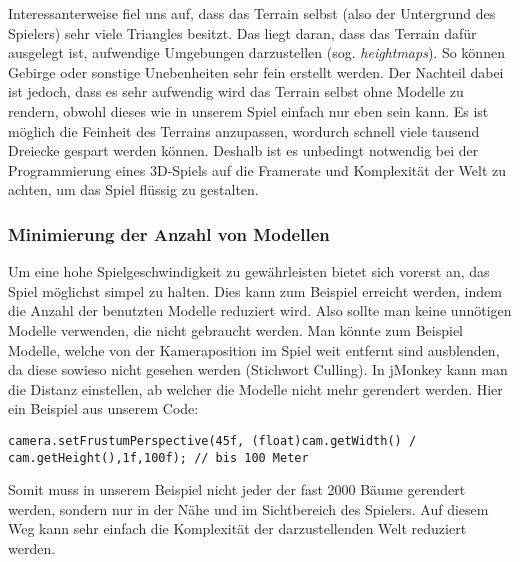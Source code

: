 Interessanterweise fiel uns auf, dass das Terrain selbst (also der Untergrund des Spielers) sehr viele Triangles besitzt. Das liegt daran, dass das Terrain dafür ausgelegt ist, aufwendige Umgebungen darzustellen (sog. \emph{heightmaps}). So können Gebirge oder sonstige Unebenheiten sehr fein erstellt werden. Der Nachteil dabei ist jedoch, dass es sehr aufwendig wird das Terrain selbst ohne Modelle zu rendern, obwohl dieses wie in unserem Spiel einfach nur eben sein kann. Es ist möglich die Feinheit des Terrains anzupassen, wordurch schnell viele tausend Dreiecke gespart werden können. Deshalb ist es unbedingt notwendig bei der Programmierung eines 3D-Spiels auf die Framerate und Komplexität der Welt zu achten, um das Spiel flüssig zu gestalten.



\subsubsection{Minimierung der Anzahl von Modellen}
Um eine hohe Spielgeschwindigkeit zu gewährleisten bietet sich vorerst an, das Spiel möglichst simpel zu halten. Dies kann zum Beispiel erreicht werden, indem die Anzahl der benutzten Modelle reduziert wird. Also sollte man keine unnötigen Modelle verwenden, die nicht gebraucht werden. Man könnte zum Beispiel Modelle, welche von der Kameraposition im Spiel weit entfernt sind ausblenden, da diese sowieso nicht gesehen werden (Stichwort Culling). In jMonkey kann man die Distanz einstellen, ab welcher die Modelle nicht mehr gerendert werden. Hier ein Beispiel aus unserem Code:


\begin{lstlisting}
camera.setFrustumPerspective(45f, (float)cam.getWidth() / cam.getHeight(),1f,100f); // bis 100 Meter
\end{lstlisting}


Somit muss in unserem Beispiel nicht jeder der fast 2000 Bäume gerendert werden, sondern nur in der Nähe und im Sichtbereich des Spielers. Auf diesem Weg kann sehr einfach die Komplexität der darzustellenden Welt reduziert werden.

